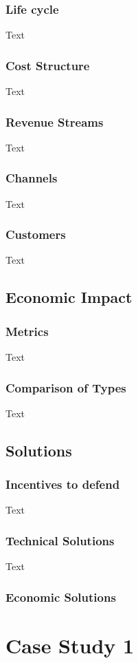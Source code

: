 		\subsubsection{Life cycle}
			Text
		\subsubsection{Cost Structure}
			Text
		\subsubsection{Revenue Streams}
			Text
		\subsubsection{Channels}
			Text
		\subsubsection{Customers}
			Text
	\subsection{Economic Impact}
		\subsubsection{Metrics}
			Text
		\subsubsection{Comparison of Types}
			Text
	\subsection{Solutions}
		\subsubsection{Incentives to defend}
			Text
		\subsubsection{Technical Solutions}
			Text
		\subsubsection{Economic Solutions}
		
\section{Case Study 1}
